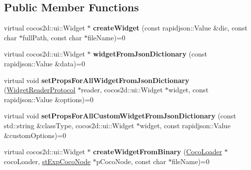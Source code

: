 \subsection*{Public Member Functions}
\begin{DoxyCompactItemize}
\item 
\mbox{\label{classcocostudio_1_1WidgetPropertiesReader_ad506e2319384c875e324f52b6903a44d}} 
virtual cocos2d\+::ui\+::\+Widget $\ast$ {\bfseries create\+Widget} (const rapidjson\+::\+Value \&dic, const char $\ast$full\+Path, const char $\ast$file\+Name)=0
\item 
\mbox{\label{classcocostudio_1_1WidgetPropertiesReader_ad4121e28432302d4231c0ec6405be741}} 
virtual cocos2d\+::ui\+::\+Widget $\ast$ {\bfseries widget\+From\+Json\+Dictionary} (const rapidjson\+::\+Value \&data)=0
\item 
\mbox{\label{classcocostudio_1_1WidgetPropertiesReader_a8a100e50ac2e54322b639310dc7d0978}} 
virtual void {\bfseries set\+Props\+For\+All\+Widget\+From\+Json\+Dictionary} (\hyperlink{classcocostudio_1_1WidgetReaderProtocol}{Widget\+Reader\+Protocol} $\ast$reader, cocos2d\+::ui\+::\+Widget $\ast$widget, const rapidjson\+::\+Value \&options)=0
\item 
\mbox{\label{classcocostudio_1_1WidgetPropertiesReader_ad5ef87b3a0ab65faeeeb09c70bbe4aff}} 
virtual void {\bfseries set\+Props\+For\+All\+Custom\+Widget\+From\+Json\+Dictionary} (const std\+::string \&class\+Type, cocos2d\+::ui\+::\+Widget $\ast$widget, const rapidjson\+::\+Value \&custom\+Options)=0
\item 
\mbox{\label{classcocostudio_1_1WidgetPropertiesReader_a8403f2eb3a6e5c555e8b40c92e9f384c}} 
virtual cocos2d\+::ui\+::\+Widget $\ast$ {\bfseries create\+Widget\+From\+Binary} (\hyperlink{classcocostudio_1_1CocoLoader}{Coco\+Loader} $\ast$coco\+Loader, \hyperlink{structcocostudio_1_1stExpCocoNode}{st\+Exp\+Coco\+Node} $\ast$p\+Coco\+Node, const char $\ast$file\+Name)=0
\item 
\mbox{\label{classcocostudio_1_1WidgetPropertiesReader_a48c24840cc7f9a48d1b0fa108f6d42b5}} 

\end{DoxyCompactItemize}
